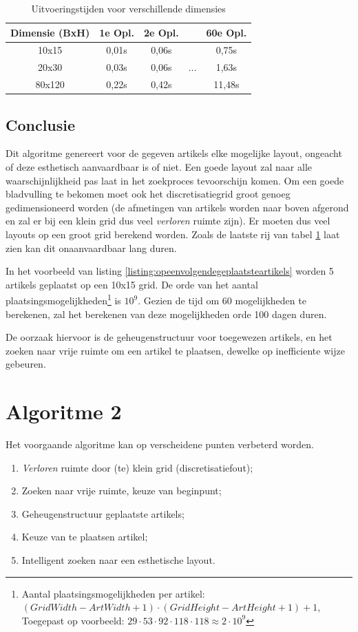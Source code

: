 \documentclass[a4paper,12pt]{report}
\begin{document}
\begin{table}[h]
  \centering
  \begin{tabular}{c|cccc}
	Dimensie (BxH) & 1e Opl. & 2e Opl. & & 60e Opl. \\
	\hline
    10x15 & 0,01s & 0,06s & & 0,75s \\ 
    20x30 & 0,03s & 0,06s & $\ldots$ & 1,63s \\ 
    80x120 & 0,22s & 0,42s & & 11,48s \\ 
  \end{tabular}
  \caption{Uitvoeringstijden voor verschillende dimensies}
  \label{tab:exectimesalg1}
\end{table}
				
		\subsection{Conclusie}
Dit algoritme genereert voor de gegeven artikels elke mogelijke layout, ongeacht of deze esthetisch aanvaardbaar is of niet. Een goede layout zal naar alle waarschijnlijkheid pas laat in het zoekproces tevoorschijn komen. Om een goede bladvulling te bekomen moet ook het discretisatiegrid groot genoeg gedimensioneerd worden (de afmetingen van artikels worden naar boven afgerond en zal er bij een klein grid dus veel \textit{verloren} ruimte zijn). Er moeten dus veel layouts op een groot grid berekend worden. Zoals de laatste rij van tabel \ref{tab:exectimesalg1} laat zien kan dit onaanvaardbaar lang duren. 

In het voorbeeld van listing \ref{listing:opeenvolgendegeplaatsteartikels} worden 5 artikels geplaatst op een 10x15 grid. De orde van het aantal plaatsingsmogelijkheden\footnote{Aantal plaatsingsmogelijkheden per artikel: $(GridWidth-ArtWidth+1) \cdot (GridHeight-ArtHeight+1)+1$, Toegepast op voorbeeld: $29 \cdot 53 \cdot 92 \cdot 118 \cdot 118 \approx 2\cdot10^{9}$} is $10^{9}$. Gezien de tijd om 60 mogelijkheden te berekenen, zal het berekenen van deze mogelijkheden orde 100 dagen duren.

De oorzaak hiervoor is de geheugenstructuur voor toegewezen artikels, en het zoeken naar vrije ruimte om een artikel te plaatsen, dewelke op inefficiente wijze gebeuren.

	\section{Algoritme 2}
Het voorgaande algoritme kan op verscheidene punten verbeterd worden.
\begin{enumerate}
	\item \textit{Verloren} ruimte door (te) klein grid (discretisatiefout); \label{VerlorenRuimte}
	\item Zoeken naar vrije ruimte, keuze van beginpunt; \label{ZoekenVrijeRuimte}
	\item Geheugenstructuur geplaatste artikels; \label{Geheugenstructuur}
	\item Keuze van te plaatsen artikel; \label{KeuzePlaatsArtikel}
	\item Intelligent zoeken naar een esthetische layout. \label{Heuristiek}
\end{enumerate}
\end{document}
